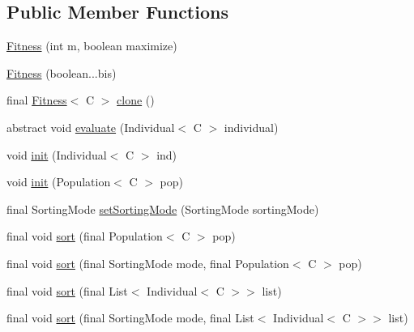 \subsection*{Public Member Functions}
\begin{DoxyCompactItemize}
\item 
\hyperlink{classjenes_1_1population_1_1_fitness_3_01_c_01extends_01_chromosome_01_4_aba60bd43d62c74ca35946ce9c75bff8f}{Fitness} (int m, boolean maximize)
\item 
\hyperlink{classjenes_1_1population_1_1_fitness_3_01_c_01extends_01_chromosome_01_4_a57836e06b6476c09409f771be28dad74}{Fitness} (boolean...\-bis)
\item 
final \hyperlink{classjenes_1_1population_1_1_fitness_3_01_c_01extends_01_chromosome_01_4_aba60bd43d62c74ca35946ce9c75bff8f}{Fitness}$<$ C $>$ \hyperlink{classjenes_1_1population_1_1_fitness_3_01_c_01extends_01_chromosome_01_4_ab685fe3afbba1f4676d363656bfba81c}{clone} ()
\item 
abstract void \hyperlink{classjenes_1_1population_1_1_fitness_3_01_c_01extends_01_chromosome_01_4_a1e93c0c2af37eb586fe77ad1dc8df761}{evaluate} (Individual$<$ C $>$ individual)
\item 
void \hyperlink{classjenes_1_1population_1_1_fitness_3_01_c_01extends_01_chromosome_01_4_a1b67ac3ad38e0d5ce0ba6a75708a5e2d}{init} (Individual$<$ C $>$ ind)
\item 
void \hyperlink{classjenes_1_1population_1_1_fitness_3_01_c_01extends_01_chromosome_01_4_afc31605de5bbaae2ca16718628c72847}{init} (Population$<$ C $>$ pop)
\item 
final Sorting\-Mode \hyperlink{classjenes_1_1population_1_1_fitness_3_01_c_01extends_01_chromosome_01_4_a8741e8d5e0045bce51edbe0d58b32e0d}{set\-Sorting\-Mode} (Sorting\-Mode sorting\-Mode)
\item 
final void \hyperlink{classjenes_1_1population_1_1_fitness_3_01_c_01extends_01_chromosome_01_4_a99d06b2b20048c7279139381247678c0}{sort} (final Population$<$ C $>$ pop)
\item 
final void \hyperlink{classjenes_1_1population_1_1_fitness_3_01_c_01extends_01_chromosome_01_4_a939407da23b7bfed0f12233a74690e46}{sort} (final Sorting\-Mode mode, final Population$<$ C $>$ pop)
\item 
final void \hyperlink{classjenes_1_1population_1_1_fitness_3_01_c_01extends_01_chromosome_01_4_a966f1a594a9eed5607e27222fd27e696}{sort} (final List$<$ Individual$<$ C $>$$>$ list)
\item 
final void \hyperlink{classjenes_1_1population_1_1_fitness_3_01_c_01extends_01_chromosome_01_4_a3b46414d970cf62539adcd5a3e065268}{sort} (final Sorting\-Mode mode, final List$<$ Individual$<$ C $>$$>$ list)

\end{DoxyCompactItemize}
